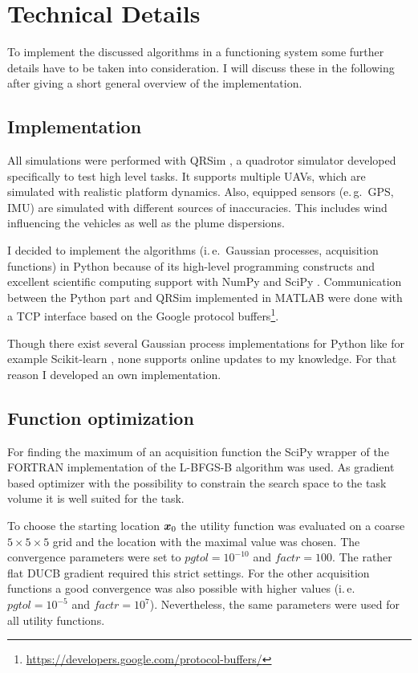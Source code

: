 \chapter{Technical Details}\label{sec:tech}
To implement the discussed algorithms in a functioning system some further 
details have to be taken into consideration. I will discuss these in the 
following after giving a short general overview of the implementation.

\section{Implementation}
All simulations were performed with QRSim \parencite{denardi2013rn}, a quadrotor 
simulator developed specifically to test high level tasks. It supports multiple 
UAVs, which are simulated with realistic platform dynamics.  Also, equipped 
sensors (e.\,g.~GPS, IMU) are simulated with different sources of inaccuracies.  
This includes wind influencing the vehicles as well as the plume dispersions.

I decided to implement the algorithms (i.\,e.~Gaussian processes, acquisition 
functions) in Python because of its high-level programming constructs and 
excellent scientific computing support with NumPy and SciPy 
\parencite{Oliphant:2007dm}. Communication between the Python part and QRSim 
implemented in MATLAB were done with a TCP interface based on the Google 
protocol 
buffers\footnote{\url{https://developers.google.com/protocol-buffers/}}.

Though there exist several Gaussian process implementations for Python like for 
example Scikit-learn \parencite[i.\,e.][]{scikit-learn}, none supports online 
updates to my knowledge.  For that reason I developed an own implementation.

\section{Function optimization}\label{sec:fnopt}
For finding the maximum of an acquisition function the SciPy wrapper of the 
\mbox{FORTRAN} implementation of the \mbox{L-BFGS-B} algorithm 
\parencite{Byrd:2006iv, Zhu:1997br} was used.  As gradient based optimizer with 
the possibility to constrain the search space to the task volume it is well 
suited for the task.

To choose the starting location $\bm{x}_0$ the utility function was evaluated on 
a coarse $5 \times 5 \times 5$ grid and the location with the maximal value was 
chosen. The convergence parameters were set to $\mathit{pgtol} = 10^{-10}$ and 
$\mathit{factr} = 100$. The rather flat DUCB gradient required this strict 
settings. For the other acquisition functions a good convergence was also 
possible with higher values (i.\,e.~$\mathit{pgtol} = 10^{-5}$ and $\mathit{factr} 
= 10^7$).  Nevertheless, the same parameters were used for all utility 
functions.

